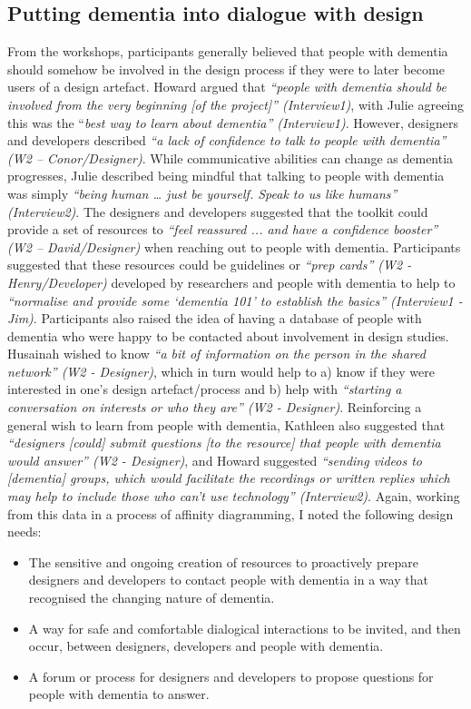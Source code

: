 \subsection{Putting dementia into dialogue with design}
From the workshops, participants generally believed that people with dementia should somehow be involved in the design process if they were to later become users of a design artefact. Howard argued that \textit{``people with dementia should be involved from the very beginning [of the project]'' (Interview1)}, with Julie agreeing this was the ``\textit{best way to learn about dementia'' (Interview1)}. However, designers and developers described \textit{``a lack of confidence to talk to people with dementia'' (W2 – Conor/Designer)}. While communicative abilities can change as dementia progresses, Julie described being mindful that talking to people with dementia was simply \textit{``being human … just be yourself. Speak to us like humans'' (Interview2)}.
The designers and developers suggested that the toolkit could provide a set of resources to \textit{``feel reassured ... and have a confidence booster'' (W2 – David/Designer)} when reaching out to people with dementia. Participants suggested that these resources could be guidelines or \textit{``prep cards'' (W2 - Henry/Developer)} developed by researchers and people with dementia to help to \textit{``normalise and provide some ‘dementia 101’ to establish the basics'' (Interview1 - Jim)}. Participants also raised the idea of having a database of people with dementia who were happy to be contacted about involvement in design studies. Husainah wished to know \textit{``a bit of information on the person in the shared network'' (W2 - Designer)}, which in turn would help to a) know if they were interested in one's design artefact/process and b) help with \textit{``starting a conversation on interests or who they are'' (W2 - Designer)}.
Reinforcing a general wish to learn from people with dementia, Kathleen also suggested that \textit{``designers [could] submit questions [to the resource] that people with dementia would answer'' (W2 - Designer)}, and Howard suggested \textit{``sending videos to [dementia] groups, which would facilitate the recordings or written replies which may help to include those who can't use technology'' (Interview2)}. Again, working from this data in a process of affinity diagramming, I noted the following design needs:
\begin{itemize}
\item The sensitive and ongoing creation of resources to proactively prepare designers and developers to contact people with dementia in a way that recognised the changing nature of dementia. 
\item A way for safe and comfortable dialogical interactions to be invited, and then occur, between designers, developers and people with dementia.
\item A forum or process for designers and developers to propose questions for people with dementia to answer.
\end{itemize}

